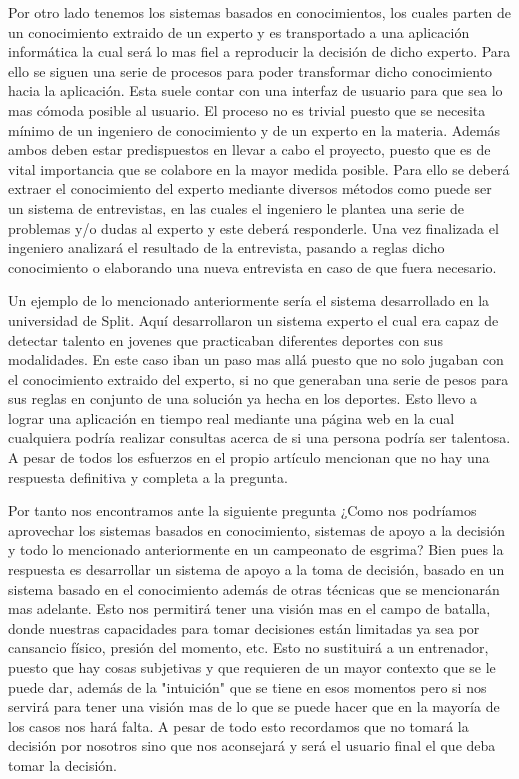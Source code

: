 Por otro lado tenemos los sistemas basados en conocimientos, los cuales parten de un conocimiento extraido de un
experto y es transportado a una aplicación informática la cual será lo mas fiel a reproducir
la decisión de dicho experto. Para ello se siguen una serie de procesos para poder transformar
dicho conocimiento hacia la aplicación. Esta suele contar con una interfaz de usuario para que
sea lo mas cómoda posible al usuario. El proceso no es trivial puesto que se necesita mínimo
de un ingeniero de conocimiento y de un experto en la materia. Además ambos deben estar predispuestos
en llevar a cabo el proyecto, puesto que es de vital importancia que se colabore en la mayor
medida posible. Para ello se deberá extraer el conocimiento del experto mediante diversos métodos
como puede ser un sistema de entrevistas, en las cuales el ingeniero le plantea una serie
de problemas y/o dudas al experto y este deberá responderle. Una vez finalizada el ingeniero
analizará el resultado de la entrevista, pasando a reglas dicho conocimiento o elaborando
una nueva entrevista en caso de que fuera necesario.

Un ejemplo de lo mencionado anteriormente sería el sistema desarrollado en la universidad de Split.
Aquí desarrollaron un sistema experto el cual era capaz de detectar talento en jovenes que
practicaban diferentes deportes con sus modalidades. En este caso iban un paso mas allá puesto
que no solo jugaban con el conocimiento extraido del experto, si no que generaban una serie de
pesos para sus reglas en conjunto de una solución ya hecha en los deportes. Esto llevo a lograr
una aplicación en tiempo real mediante una página web en la cual cualquiera podría realizar consultas
acerca de si una persona podría ser talentosa. A pesar de todos los esfuerzos en el propio artículo
mencionan que no hay una respuesta definitiva y completa a la pregunta.

Por tanto nos encontramos ante la siguiente pregunta ¿Como nos podríamos aprovechar los
sistemas basados en conocimiento, sistemas de apoyo a la decisión y todo lo mencionado
anteriormente en un campeonato de esgrima? Bien pues la respuesta es desarrollar un sistema de apoyo
a la toma de decisión, basado en un sistema basado en el conocimiento además de otras técnicas que
se mencionarán mas adelante. Esto nos permitirá tener una visión mas en el campo de batalla, donde
nuestras capacidades para tomar decisiones están limitadas ya sea por cansancio físico, presión del
momento, etc. Esto no sustituirá a un entrenador, puesto que hay cosas subjetivas y que requieren
de un mayor contexto que se le puede dar, además de la "intuición" que se tiene en esos momentos
pero si nos servirá para tener una visión mas de lo que se puede hacer que en la mayoría de los
casos nos hará falta. A pesar de todo esto recordamos que no tomará la decisión por nosotros
sino que nos aconsejará y será el usuario final el que deba tomar la decisión.

